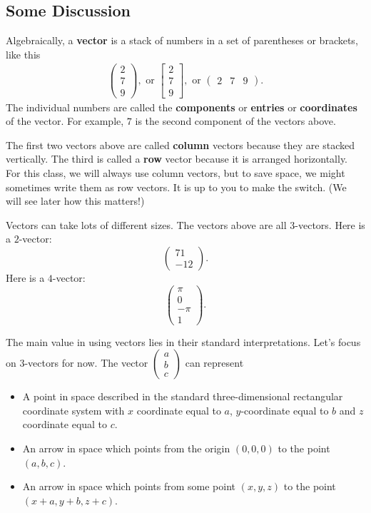 \documentclass[10pt,]{book}
\newcommand{\terminology}[1]{\textbf{#1}}
\theoremstyle{plain}
\theoremstyle{definition}
\numberwithin{equation}{section}
\begin{document}
\subsection[Some Discussion]{Some Discussion}\label{subsection-3}
Algebraically, a \terminology{vector} is a stack of numbers in a set of
     parentheses or brackets, like this\begin{align*}
\begin{pmatrix} 2 \\ 7 \\ 9 \end{pmatrix}, \text{ or }
          \begin{bmatrix}2 \\ 7 \\ 9 \end{bmatrix}, \text{ or }
          \begin{pmatrix} 2 & 7 & 9 \end{pmatrix}.
\end{align*}
     The individual numbers are called the \terminology{components} or \terminology{entries}
     or \terminology{coordinates} of the vector. For example, \(7\) is the second
     component of the vectors above.%
\par
The first two vectors above are called \terminology{column} vectors
        because they are stacked vertically. The third is called a \terminology{row} vector because it is arranged horizontally. For this class, we will always use column vectors, but to save space, we might sometimes write them as row vectors. It is up to you to make the switch. (We will see later how this matters!)%
\par
Vectors can take lots of different sizes. The vectors above are all \(3\)-vectors. Here is a \(2\)-vector: \[\begin{pmatrix} 71 \\ -12 \end{pmatrix}.\] Here is a \(4\)-vector: \[\begin{pmatrix} \pi \\ 0 \\ -\pi \\ 1\end{pmatrix}.\]%
\par
The main value in using vectors lies in their standard interpretations. Let's focus on \(3\)-vectors for now. The vector \(\left(\begin{smallmatrix} a \\ b \\ c\end{smallmatrix}\right)\) can represent \begin{itemize}
\item{}A point in space described in the standard three-dimensional rectangular coordinate system with \(x\) coordinate equal to \(a\), \(y\)-coordinate equal to \(b\) and \(z\) coordinate equal to \(c\).%
\item{}An arrow in space which points from the origin \((0,0,0)\) to the point \((a,b,c)\).%
\item{}An arrow in space which points from some point \((x,y,z)\) to the point \((x+a,y+b,z+c)\).%
\end{itemize}
\end{document}
